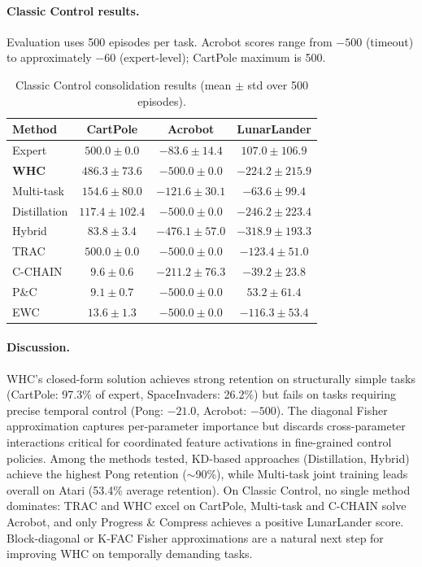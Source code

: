 \documentclass[11pt]{article}
\begin{document}
\paragraph{Classic Control results.}
Evaluation uses 500 episodes per task. Acrobot scores range from $-500$ (timeout) to
approximately $-60$ (expert-level); CartPole maximum is 500.

\begin{table}[h]
\centering
\begin{tabular}{lccc}
\toprule
\textbf{Method} & \textbf{CartPole} & \textbf{Acrobot} & \textbf{LunarLander} \\
\midrule
Expert        & $500.0 \pm 0.0$   & $-83.6 \pm 14.4$   & $107.0 \pm 106.9$ \\
\midrule
\textbf{WHC}  & $486.3 \pm 73.6$  & $-500.0 \pm 0.0$   & $-224.2 \pm 215.9$ \\
Multi-task    & $154.6 \pm 80.0$  & $-121.6 \pm 30.1$  & $-63.6 \pm 99.4$ \\
Distillation  & $117.4 \pm 102.4$ & $-500.0 \pm 0.0$   & $-246.2 \pm 223.4$ \\
Hybrid        & $83.8 \pm 3.4$    & $-476.1 \pm 57.0$  & $-318.9 \pm 193.3$ \\
TRAC          & $500.0 \pm 0.0$   & $-500.0 \pm 0.0$   & $-123.4 \pm 51.0$ \\
C-CHAIN       & $9.6 \pm 0.6$     & $-211.2 \pm 76.3$  & $-39.2 \pm 23.8$ \\
P\&C          & $9.1 \pm 0.7$     & $-500.0 \pm 0.0$   & $53.2 \pm 61.4$ \\
EWC           & $13.6 \pm 1.3$    & $-500.0 \pm 0.0$   & $-116.3 \pm 53.4$ \\
\bottomrule
\end{tabular}
\caption{Classic Control consolidation results (mean $\pm$ std over 500 episodes).}
\label{tab:classic}
\end{table}

\paragraph{Discussion.}
WHC's closed-form solution achieves strong retention on structurally simple tasks
(CartPole: 97.3\% of expert, SpaceInvaders: 26.2\%) but fails on tasks requiring
precise temporal control (Pong: $-21.0$, Acrobot: $-500$). The diagonal Fisher
approximation captures per-parameter importance but discards cross-parameter
interactions critical for coordinated feature activations in fine-grained control
policies. Among the methods tested, KD-based approaches (Distillation, Hybrid)
achieve the highest Pong retention ($\sim$90\%), while Multi-task joint training
leads overall on Atari (53.4\% average retention). On Classic Control, no single
method dominates: TRAC and WHC excel on CartPole, Multi-task and C-CHAIN solve
Acrobot, and only Progress \& Compress achieves a positive LunarLander score.
Block-diagonal or K-FAC Fisher approximations are a natural next step for
improving WHC on temporally demanding tasks.
\end{document}
